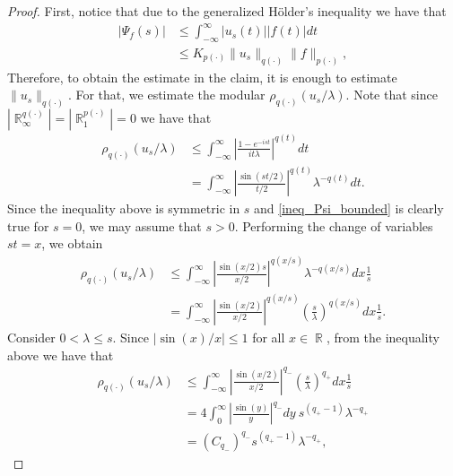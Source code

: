 \documentclass[11pt,reqno]{amsart}
\theoremstyle{definition}
\theoremstyle{definition}
\theoremstyle{definition}
\DeclareMathOperator{\R}{\mathbb{R}}
\begin{document}
\begin{proof}
 First, notice that due to the generalized Hölder's inequality we have that
    \begin{align*}
        |\Psi_f(s)|&\leq \int_{-\infty}^{\infty}|u_s(t)||f(t)|dt\\
        &\leq K_{p(\cdot)}\|u_s\|_{q(\cdot)}\|f\|_{p(\cdot)},
    \end{align*}
     Therefore, to obtain the estimate in the claim, it is enough to estimate $\|u_s\|_{q(\cdot)}$. For that, we estimate the modular $\rho_{q(\cdot)}(u_s/\lambda)$. Note that since $\left|\R_\infty^{q(\cdot)}\right|=\left|\R_1^{p(\cdot)}\right|=0$ we have that
    \begin{align*}
        \rho_{q(\cdot)}(u_s/\lambda)&\leq \int_{-\infty}^{\infty}\left|\frac{1-e^{-ist}}{it\lambda}\right|^{q(t)}dt%
        \\
        &=\int_{-\infty}^{\infty}\left|\frac{\sin(st/2)}{t/2}\right|^{q(t)}\lambda^{-q(t)}dt.%
    \end{align*}
    Since the inequality above is symmetric in $s$ and \eqref{ineq_Psi_bounded} is clearly true for $s=0$, we may assume that $s>0$. Performing the change of variables $st=x$, we obtain
    \begin{align*}
        \rho_{q(\cdot)}(u_s/\lambda)&\leq\int_{-\infty}^{\infty}\left|\frac{\sin(x/2)s}{x/2}\right|^{q(x/s)}\lambda^{-q(x/s)}dx\frac{1}{s}%
        \\
        &=\int_{-\infty}^{\infty}\left|\frac{\sin(x/2)}{x/2}\right|^{q(x/s)}\left(\frac{s}{\lambda}\right)^{q(x/s)}dx\frac{1}{s}.%
    \end{align*}
     Consider $0<\lambda\leq s$.  Since $|\sin(x)/x|\leq 1$ for all $x\in\R$, from the inequality above we have that
     \begin{align*}
        \rho_{q(\cdot)}(u_s/\lambda)&\leq 
        \int_{-\infty}^{\infty}\left|\frac{\sin(x/2)}{x/2}\right|^{q_{-}}\left(\frac{s}{\lambda}\right)^{q_{+}}dx\frac{1}{s}%
       \\
&=4\int_0^{\infty}\left|\frac{\sin(y)}{y}\right|^{q_{-}}dy\ s^{(q_{+}-1)}\lambda^{-q_{+}}%
       \\
       &= (C_{q_{-}})^{q_{-}}s^{(q_{+}-1)}\lambda^{-q_{+}},

\end{align*}
\end{proof}
\end{document}
